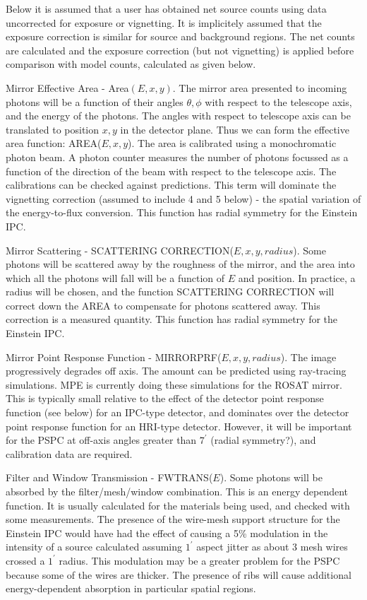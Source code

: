 Below it is assumed that a user has obtained
net source counts using data uncorrected for exposure or vignetting.
It is implicitely assumed that the exposure correction is similar for 
source and background regions.  The net counts are calculated and the 
exposure correction (but not vignetting) is
applied before comparison with model counts, calculated as given below.

\@{Mirror Effective Area - Area$(E,x,y)$.}
The mirror area presented to incoming photons will be a function
of their angles $\theta, \phi$ with respect to the telescope axis, and
the energy of the photons. The angles with respect to telescope
axis can be translated to position $x,y$ in the detector plane. Thus
we can form the effective area function: AREA($E,x,y$).
The area is calibrated using a monochromatic photon beam.
A photon counter measures the number of photons focussed
as a function of the direction of the beam with respect to
the telescope axis. The calibrations can be checked against predictions.
This term will dominate the vignetting correction (assumed to include
4 and 5 below) - the
spatial variation of the energy-to-flux conversion.  This function
has radial symmetry for the Einstein IPC.

\@{Mirror Scattering  -  SCATTERING CORRECTION($E,x,y,radius$).}
Some photons will be scattered away by the roughness of the
mirror, and the area
into which all the photons will fall will be a function of $E$ and
position. In practice, a radius will be chosen, and the function
SCATTERING CORRECTION
will correct down the AREA to compensate for photons scattered away.
This correction is a measured quantity.  This function
has radial symmetry for the Einstein IPC.

\@{Mirror Point Response Function -  MIRRORPRF($E,x,y,radius$).}
The image progressively degrades off axis.  The amount can be
predicted using ray-tracing simulations. MPE is currently doing these
simulations for the ROSAT mirror.  This is typically small relative to the
effect of the detector point response function (see below) for
an IPC-type detector, and dominates over the detector point response
function for an HRI-type detector.  However, it will be important for the
PSPC at off-axis angles greater than $7^\prime$
(radial symmetry?), and calibration data are required.

\@{Filter and Window Transmission - FWTRANS($E$).}
Some photons will be absorbed by the filter/mesh/window combination. This
is an energy dependent function. It is usually calculated for the
materials being used, and checked with some measurements.
The presence of the wire-mesh support structure for the Einstein IPC
would have had the effect of causing a 5\% modulation
in the intensity of a source calculated assuming $1^\prime$ aspect jitter as
about 3 mesh wires crossed a $1^\prime$ radius. This 
modulation may be a greater problem for
the PSPC because some of the wires are thicker.  The presence of ribs will
cause additional energy-dependent absorption in particular spatial regions.

